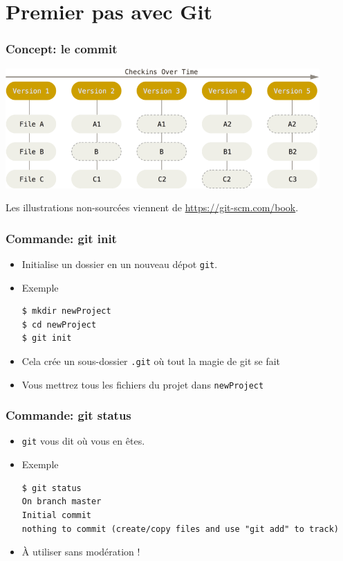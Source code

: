 \documentclass{beamer}
\begin{document}
\section{Premier pas avec Git}

\begin{frame}
\frametitle{Concept: le \textbf{commit}}

\begin{center}
    \includegraphics[width=0.9\textwidth]{img/commits.png}
\end{center}
\footnotesize{Les illustrations non-sourcées viennent de \url{https://git-scm.com/book}.}
\end{frame}

\begin{frame}[fragile]
\frametitle{Commande: git init}
\begin{itemize}
\item Initialise un dossier en un nouveau dépot \texttt{git}.
\item Exemple
\begin{lstlisting}
$ mkdir newProject
$ cd newProject
$ git init
\end{lstlisting}
\item Cela crée un sous-dossier \texttt{.git} où tout la magie de git se fait
\item Vous mettrez tous les fichiers du projet dans \texttt{newProject}
\end{itemize}
\end{frame}

\begin{frame}[fragile]
\frametitle{Commande: git status}
\begin{itemize}
    \item \texttt{git} vous dit o\`u vous en êtes.
    \item Exemple
\begin{lstlisting}
$ git status
On branch master
Initial commit
nothing to commit (create/copy files and use "git add" to track)
\end{lstlisting}
\item À utiliser sans modération !
\end{itemize}
\end{frame}
\end{document}
